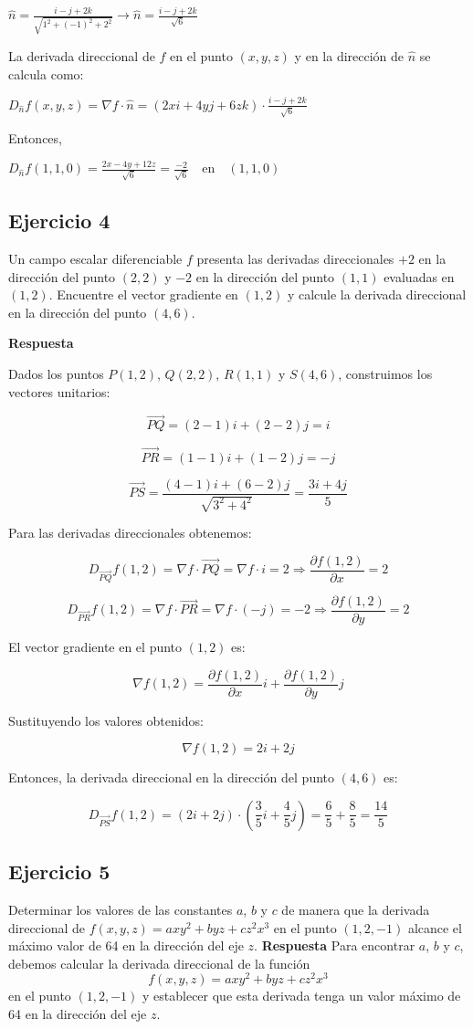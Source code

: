 \documentclass{report}
\begin{document}
    $\hat{n} = \frac{i - j + 2k}{\sqrt{1^2 + (-1)^2 + 2^2}} \to  \hat{n}=\frac{i - j + 2k}{\sqrt{6}}$

    La derivada direccional de $f$ en el punto $(x, y, z)$ y en la dirección de $\hat{n}$ se calcula como:

    $D_{\hat{n}} f(x, y, z) = \nabla f \cdot \hat{n} = (2xi + 4yj + 6zk) \cdot \frac{i - j + 2k}{\sqrt{6}}$

    Entonces,

    $D_{\hat{n}} f(1, 1, 0) = \frac{2x - 4y + 12z}{\sqrt{6}} = \frac{-2}{\sqrt{6}} \quad \text{en} \quad (1, 1, 0)$\subsection*{Ejercicio 4}
    Un campo escalar diferenciable $f$ presenta las derivadas direccionales $+2$ en la dirección del punto $(2,2)$ y $-2$ en la dirección del punto $(1,1)$ evaluadas en $(1,2)$. Encuentre el vector gradiente en $(1,2)$ y calcule la derivada direccional en la dirección del punto $(4,6)$.

    \textbf{Respuesta}

    Dados los puntos $P(1,2)$, $Q(2,2)$, $R(1,1)$ y $S(4,6)$, construimos los vectores unitarios:

    $$\vec{PQ}=(2-1)i+(2-2)j=i$$

    $$\vec{PR}=(1-1)i+(1-2)j=-j$$

    $$\vec{PS}=\frac{(4-1)i+(6-2)j}{\sqrt{3^2+4^2}}=\frac{3i+4j}{5}$$

    Para las derivadas direccionales obtenemos:

    $$D_{\vec{PQ}}f(1,2)=\nabla f \cdot \vec{PQ}=\nabla f \cdot i=2 \Rightarrow \frac{\partial f(1,2)}{\partial x}=2$$

    $$D_{\vec{PR}}f(1,2)=\nabla f \cdot \vec{PR}=\nabla f \cdot (-j)=-2 \Rightarrow \frac{\partial f(1,2)}{\partial y}=2$$

    El vector gradiente en el punto $(1,2)$ es:

    $$\nabla f(1,2)=\frac{\partial f(1,2)}{\partial x}i+\frac{\partial f(1,2)}{\partial y}j$$

    Sustituyendo los valores obtenidos:

    $$\nabla f(1,2)=2i+2j$$

    Entonces, la derivada direccional en la dirección del punto $(4,6)$ es:

    $$D_{\vec{PS}}f(1,2)=(2i+2j) \cdot \left(\frac{3}{5}i+\frac{4}{5}j\right)=\frac{6}{5}+\frac{8}{5}=\frac{14}{5}$$\subsection*{Ejercicio 5}
    Determinar los valores de las constantes $a$, $b$ y $c$ de manera que la derivada direccional de $f(x, y, z)=a x y^{2}+b y z+c z^{2} x^{3}$ en el punto $(1,2,-1)$ alcance el máximo valor de 64 en la dirección del eje $z$.
    \textbf{Respuesta}
    Para encontrar $a$, $b$ y $c$, debemos calcular la derivada direccional de la función 
    \[
    f(x, y, z) = a x y^2 + b y z + c z^2 x^3 
    \]
    en el punto \( (1, 2, -1) \) y establecer que esta derivada tenga un valor máximo de 64 en la dirección del eje \(z\).
\end{document}
